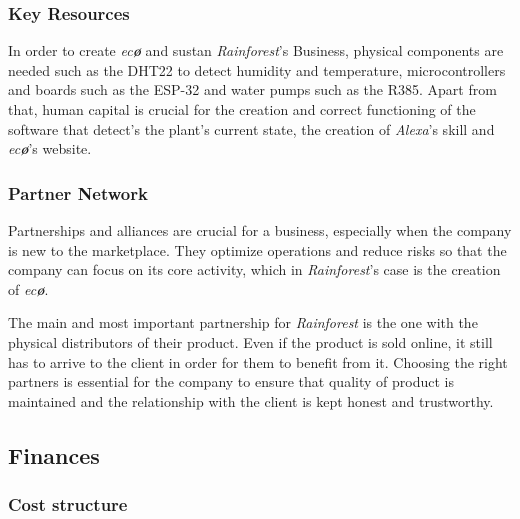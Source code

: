 \documentclass[english,runningheads,a4paper]{llncs}[2018/03/10]
\begin{document}

        \subsubsection*{Key Resources}

        In order to create \textit{ec\textbf{\o}} and sustan
        \textit{Rainforest}'s Business, physical components are needed such as
        the DHT22 to detect humidity and temperature, microcontrollers and
        boards such as the ESP-32 and water pumps such as the R385. Apart from
        that, human capital is crucial for the creation and correct functioning
        of the software that detect's the plant's current state, the creation of
        \textit{Alexa}'s skill and \textit{ec\textbf{\o}}'s website.


        \subsubsection*{Partner Network}

        Partnerships and alliances are crucial for a business, especially when
        the company is new to the marketplace. They optimize operations and
        reduce risks so that the company can focus on its core activity, which
        in \textit{Rainforest}'s case is the creation of \textit{ec\textbf{\o}}.

        The main and most important partnership for \textit{Rainforest} is the
        one with the physical distributors of their product. Even if the product
        is sold online, it still has to arrive to the client in order for them
        to benefit from it. Choosing the right partners is essential for the
        company to ensure that quality of product is maintained and the
        relationship with the client is kept honest and trustworthy.
    

    \subsection*{Finances}

        \subsubsection*{Cost structure}
\end{document}
